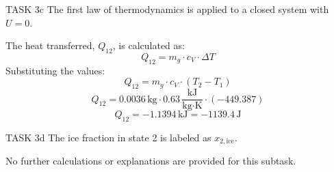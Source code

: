 TASK 3c  
The first law of thermodynamics is applied to a closed system with \( U = 0 \).  

The heat transferred, \( Q_{12} \), is calculated as:  
\[
Q_{12} = m_g \cdot c_V \cdot \Delta T
\]  
Substituting the values:  
\[
Q_{12} = m_g \cdot c_V \cdot (T_2 - T_1)
\]  
\[
Q_{12} = 0.0036 \, \text{kg} \cdot 0.63 \, \frac{\text{kJ}}{\text{kg·K}} \cdot (-449.387)
\]  
\[
Q_{12} = -1.1394 \, \text{kJ} = -1139.4 \, \text{J}
\]  

TASK 3d  
The ice fraction in state 2 is labeled as \( x_{2,\text{ice}} \).  

No further calculations or explanations are provided for this subtask.
